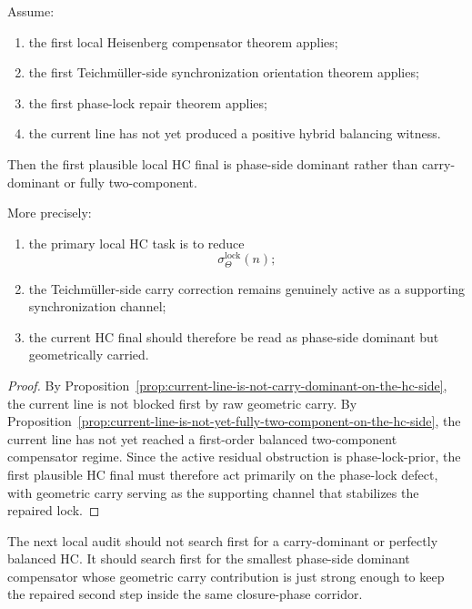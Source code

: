 \begin{theorem}
\label{thm:first-hc-final-type-orientation-theorem}
Assume:
\begin{enumerate}[leftmargin=2em,label=(\alph*)]
 \item the first local Heisenberg compensator theorem applies;
 \item the first Teichm\"uller-side synchronization orientation theorem applies;
 \item the first phase-lock repair theorem applies;
 \item the current line has not yet produced a positive hybrid balancing witness.
\end{enumerate}
Then the first plausible local HC final is phase-side dominant rather than carry-dominant or fully two-component.

More precisely:
\begin{enumerate}[leftmargin=2em,label=(\roman*)]
 \item the primary local HC task is to reduce
 \[
 \sigma_{\Theta}^{\mathrm{lock}}(n);
 \]
 \item the Teichm\"uller-side carry correction remains genuinely active as a supporting synchronization channel;
 \item the current HC final should therefore be read as phase-side dominant but geometrically carried.
\end{enumerate}
\end{theorem}

\begin{proof}
By Proposition~\ref{prop:current-line-is-not-carry-dominant-on-the-hc-side}, the current line is not blocked first by raw geometric carry. By Proposition~\ref{prop:current-line-is-not-yet-fully-two-component-on-the-hc-side}, the current line has not yet reached a first-order balanced two-component compensator regime. Since the active residual obstruction is phase-lock-prior, the first plausible HC final must therefore act primarily on the phase-lock defect, with geometric carry serving as the supporting channel that stabilizes the repaired lock.
\end{proof}

\begin{corollary}
\label{cor:current-hc-final-working-rule}
The next local audit should not search first for a carry-dominant or perfectly balanced HC. It should search first for the smallest phase-side dominant compensator whose geometric carry contribution is just strong enough to keep the repaired second step inside the same closure-phase corridor.
\end{corollary}

